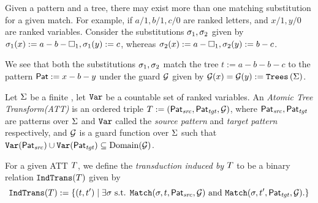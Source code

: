 \begin{example}\label{exp:multipleMatching}
    Given a pattern and a tree, there may exist more than one matching substitution for a given match. For example, if $a/1, b/1, c/0$ are ranked letters, and $x/1, y/0$ are ranked variables.
    Consider the substitutions $\sigma_1, \sigma_2$ given by $\sigma_1(x) := a-b-\square_1, \sigma_1(y) := c$, whereas $\sigma_2(x) := a-\square_1, \sigma_2(y) := b-c$.

    We see that both the substitutions $\sigma_1, \sigma_2$ match the tree $t := a-b-b-c$ to the pattern $\mathsf{Pat} := x-b-y$ under the guard $\mathcal{G}$ given by $\mathcal{G}(x) = \mathcal{G}(y) := \texttt{Trees}\left(\Sigma\right)$.
\end{example}


\begin{definition}\label{def:atomicTreeTransform}
    Let $\Sigma$ be a finite \rab, let $\texttt{Var}$ be a countable set of ranked variables. An \emph{Atomic Tree Transform(ATT)} is an ordered triple $T := (\mathsf{Pat}_{\mathit{src}}, \mathsf{Pat}_{\mathit{tgt}}, \mathcal{G})$, where $\mathsf{Pat}_{\mathit{src}}, \mathsf{Pat}_{\mathit{tgt}}$ are patterns over $\Sigma$ and $\texttt{Var}$ called the \emph{source pattern} and \emph{target pattern} respectively, and $\mathcal{G}$ is a guard function over $\Sigma$ such that $\texttt{Var}(\mathsf{Pat}_{\mathit{src}}) \cup \texttt{Var}(\mathsf{Pat}_{\mathit{tgt}}) \subseteq \operatorname{Domain}(\mathcal{G})$.
\end{definition}

For a given ATT $T$, we define the \emph{transduction induced by $T$} to be a binary relation $\texttt{IndTrans}(T)$ given by
\[
    \texttt{IndTrans}(T) := \left\{ (t, t') \mid \exists \sigma \mbox{ s.t. } \texttt{Match}(\sigma, t, \mathsf{Pat}_{\mathit{src}}, \mathcal{G}) \mbox{ and } \texttt{Match}(\sigma, t', \mathsf{Pat}_{\mathit{tgt}}, \mathcal{G}). \right\}
\]

